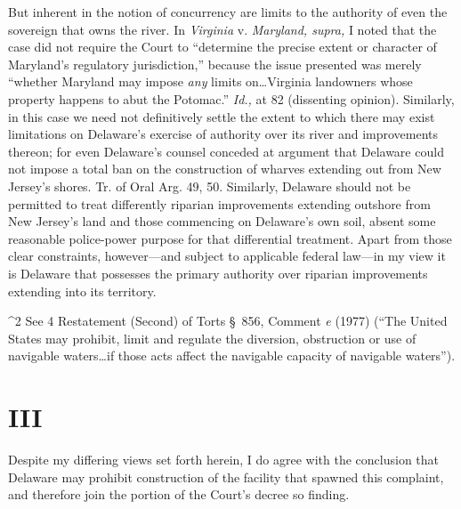   But inherent in the notion of concurrency are limits to the authority
of even the sovereign that owns the river. In \emph{Virginia} v.
\emph{Maryland, supra,} I noted that the case did not require the Court to
``determine the precise extent or character of Maryland's regulatory
jurisdiction,'' because the issue presented was merely ``whether
Maryland may impose \emph{any} limits on\dots Virginia landowners whose
property happens to abut the Potomac.'' \emph{Id.,} at 82 (dissenting
opinion). Similarly, in this case we need not definitively settle the
extent to which there may exist limitations on Delaware's exercise of
authority over its river and improvements thereon; for even Delaware's
counsel conceded at argument that Delaware could not impose a total ban
on the construction of wharves extending out from New Jersey's shores.
Tr. of Oral Arg. 49, 50. Similarly, Delaware should not be permitted
to treat differently riparian improvements extending outshore from New
Jersey's land and those commencing on Delaware's own soil, absent
some reasonable police-power purpose for that differential treatment.
Apart from those clear constraints, however---and subject to applicable
federal law\footnotemark[2]---in my view it is Delaware that possesses the primary
authority over riparian improvements extending into its territory.

^2 See 4 Restatement (Second) of Torts \S~856, Comment \emph{e} (1977)
(``The United States may prohibit, limit and regulate the diversion,
obstruction or use of navigable waters\dots if those acts affect the
navigable capacity of navigable waters''). \newpage 

\section{III}

  Despite my differing views set forth herein, I do agree with the
conclusion that Delaware may prohibit construction of the facility that
spawned this complaint, and therefore join the portion of the Court's
decree so finding.
